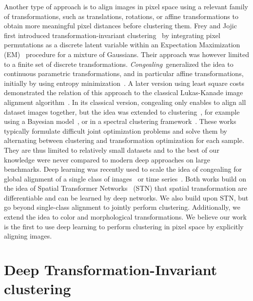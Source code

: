 \documentclass{article}
\begin{document}
\vspace{-0.3em}
Another type of approach is to align images in pixel space using a relevant family of 
transformations, such as translations, rotations, or affine transformations to obtain more 
meaningful pixel distances before clustering them. Frey and Jojic first introduced 
transformation-invariant clustering~\cite{freyEstimatingMixtureModels1999,
freyFastLargescaleTransformationinvariant2002, 
freyTransformationinvariantClusteringUsing2003} by integrating pixel permutations as a 
discrete latent variable within an Expectation Maximization 
(EM)~\cite{dempsterMaximumLikelihoodIncomplete1977} procedure for a mixture of Gaussians.  
Their approach was however limited to a finite set of discrete transformations.  {\it 
Congealing}\ generalized the idea to continuous parametric transformations, and in particular 
affine transformations, initially by using entropy 
minimization~\cite{miller2000learning,learned2005data}. A later version using least square 
costs~\cite{cox2008least,cox2009least} demonstrated the relation of this approach to the  
classical Lukas-Kanade image alignment algorithm~\cite{lucas1981iterative}.
In its classical version, congealing only enables to align all dataset images together, but 
the idea was extended to clustering~\cite{liu2009simultaneous, 
mattar2012unsupervised,li2016transformation}, for example using a Bayesian 
model~\cite{mattar2012unsupervised}, or in a spectral clustering 
framework~\cite{li2016transformation}. These works typically formulate difficult joint 
optimization problems and solve them by alternating between clustering and transformation 
optimization for each sample. They are thus limited to relatively small datasets and to the 
best of our knowledge were never compared to modern deep approaches on large benchmarks. Deep 
learning was recently used to scale the idea of congealing for global alignment of a single 
class of images~\cite{annunziata2019jointly} or time series~\cite{weber2019diffeomorphic}. 
Both works build on the idea of Spatial Transformer 
Networks~\cite{jaderbergSpatialTransformerNetworks2015} (STN) that spatial transformation are 
differentiable and can be learned by deep networks. We also build upon STN, but go beyond 
single-class alignment to jointly perform clustering. Additionally, we extend the idea to 
color and morphological transformations. We believe our work is the first to use deep 
learning to perform clustering in pixel space by explicitly aligning images. 

\section{Deep Transformation-Invariant clustering}\label{sec:approach}
\end{document}
